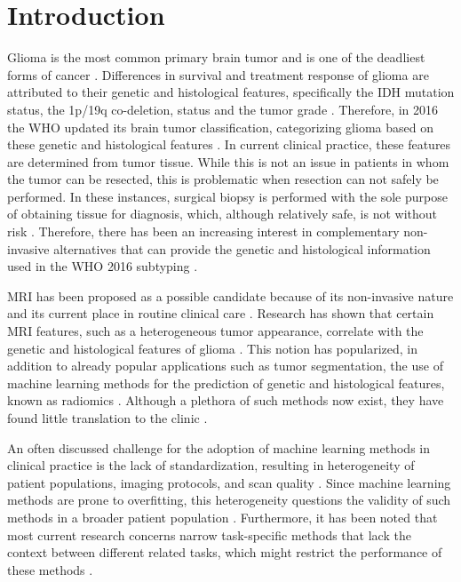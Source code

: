 \section{Introduction}
Glioma is the most common primary brain \gls{tumor} and is one of the deadliest forms of cancer \autocite{office2019cancer}.
Differences in survival and treatment response of glioma are attributed to their genetic and histological features, specifically the \gls{IDH} mutation status, the 1p/19q co-deletion, status and the \gls{tumor} grade \autocite{dubbink2015molecular, eckel2015gliomagroups}.
Therefore, in 2016 the \gls{WHO} updated its brain \gls{tumor} classification, categorizing glioma based on these genetic and histological features \autocite{louis20162016}.
In current clinical practice, these features are determined from \gls{tumor} tissue.
While this is not an issue in patients in whom the \gls{tumor} can be resected, this is problematic when resection can not safely be performed.
In these instances,  surgical biopsy is performed with the sole purpose of obtaining tissue for diagnosis, which, although relatively safe, is not without risk \autocite{chen2009biopsy, jackson2001biopsylimitations}.
Therefore, there has been an increasing interest in complementary non-invasive alternatives that can provide the genetic and histological information used in the \gls{WHO} 2016 subtyping \autocite{zhou2018radiomicsbrain, bi2019AIcancer}.

\Gls{MRI} has been proposed as a possible candidate because of its non-invasive nature and its current place in routine clinical care \autocite{chaddad2019radiomicsglioblastoma}.
Research has shown that certain \gls{MRI} features, such as a heterogeneous \gls{tumor} appearance, correlate with the genetic and histological features of glioma \autocite{smits2016imaging, delfanti2017imagingcorrelates}.
This notion has popularized, in addition to already popular applications such as \gls{tumor} segmentation, the use of machine learning methods for the prediction of genetic and histological features, known as radiomics \autocite{gore2020review, aerts2014decoding, chichate2020review}.
Although a plethora of such methods now exist, they have found little translation to the clinic \autocite{gore2020review}.

An often discussed challenge for the adoption of machine learning methods in clinical practice is the lack of standardization, resulting in heterogeneity of patient populations, imaging protocols, and scan quality \autocite{gillies2016radiomics, thrall2018AIradiology}.
Since machine learning methods are prone to overfitting, this heterogeneity questions the validity of such methods in a broader patient population \autocite{thrall2018AIradiology}.
Furthermore, it has been noted that most current research concerns narrow task-specific methods that lack the context between different related tasks, which might restrict the performance of these methods \autocite{hosny2018AI}.

